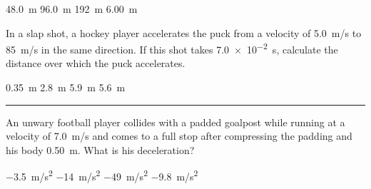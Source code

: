 \documentclass[../main-physics-problems.tex]{subfiles}
\begin{document}
\begin{questions}
\begin{choices}
\choice \SI{48.0}{m}
\choice \SI{96.0}{m}
\correctchoice \SI{192}{m}
\choice \SI{6.00}{m}
\end{choices}






%
\question %
In a slap shot, a hockey player accelerates the puck from a velocity of \SI{5.0}{m/s} to \SI{85}{m/s} in the same direction. If this shot takes \SI{7.0e-2}{s}, calculate the distance over which the puck accelerates.

\begin{choices}
\choice \SI{0.35}{m}
\correctchoice \SI{2.8}{m}
\choice \SI{5.9}{m}
\choice \SI{5.6}{m}
\end{choices}









\vspace{1em}
\hrule

\question %
An unwary football player collides with a padded goalpost while running at a velocity of \SI{7.0}{m/s} and comes to a full stop after compressing the padding and his body \SI{0.50}{m}. What is his deceleration?

\begin{choices}
\choice \SI{-3.5}{m/s^2}
\choice \SI{-14}{m/s^2}
\correctchoice \SI{-49}{m/s^2}
\choice \SI{-9.8}{m/s^2}
\end{choices}


\end{questions}
\end{document}
